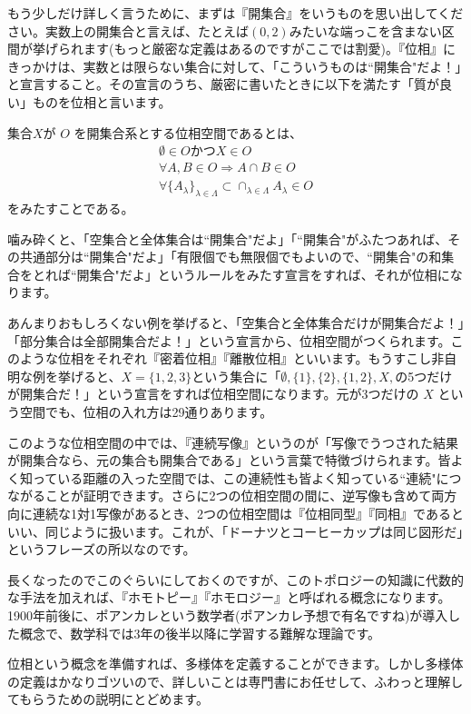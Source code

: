 もう少しだけ詳しく言うために、まずは『開集合』をいうものを思い出してください。実数上の開集合と言えば、たとえば$(0,2)$みたいな端っこを含まない区間が挙げられます(もっと厳密な定義はあるのですがここでは割愛)。『位相』にきっかけは、実数とは限らない集合に対して、「こういうものは``開集合"だよ！」と宣言すること。その宣言のうち、厳密に書いたときに以下を満たす「質が良い」ものを位相と言います。

集合$X$が $O$ を開集合系とする位相空間であるとは、
\begin{gather*}
\emptyset \in O かつ X \in O \\
\forall A,B \in O \Rightarrow A \cap B \in O \\
\forall \{A_\lambda\}_{\lambda \in \Lambda} \subset {\cap}_{\lambda \in \Lambda} A_\lambda \in O
\end{gather*}
をみたすことである。

噛み砕くと、「空集合と全体集合は``開集合"だよ」「``開集合"がふたつあれば、その共通部分は``開集合"だよ」「有限個でも無限個でもよいので、``開集合"の和集合をとれば``開集合"だよ」というルールをみたす宣言をすれば、それが位相になります。

あんまりおもしろくない例を挙げると、「空集合と全体集合だけが開集合だよ！」「部分集合は全部開集合だよ！」という宣言から、位相空間がつくられます。このような位相をそれぞれ『密着位相』『離散位相』といいます。もうすこし非自明な例を挙げると、$X = \{1,2,3\}$という集合に「$\emptyset,\{1\},\{2\},\{1,2\},X,$の5つだけが開集合だ！」という宣言をすれば位相空間になります。元が3つだけの $X$ という空間でも、位相の入れ方は29通りあります。

このような位相空間の中では、『連続写像』というのが「写像でうつされた結果が開集合なら、元の集合も開集合である」という言葉で特徴づけられます。皆よく知っている距離の入った空間では、この連続性も皆よく知っている``連続"につながることが証明できます。さらに2つの位相空間の間に、逆写像も含めて両方向に連続な1対1写像があるとき、2つの位相空間は『位相同型』『同相』であるといい、同じように扱います。これが、「ドーナツとコーヒーカップは同じ図形だ」というフレーズの所以なのです。

長くなったのでこのぐらいにしておくのですが、このトポロジーの知識に代数的な手法を加えれば、『ホモトピー』『ホモロジー』と呼ばれる概念になります。1900年前後に、ポアンカレという数学者(ポアンカレ予想で有名ですね)が導入した概念で、数学科では3年の後半以降に学習する難解な理論です。

位相という概念を準備すれば、多様体を定義することができます。しかし多様体の定義はかなりゴツいので、詳しいことは専門書にお任せして、ふわっと理解してもらうための説明にとどめます。

